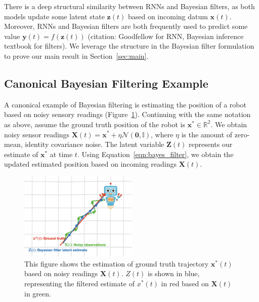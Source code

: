 \documentclass[12pt]{article}
\begin{document}
There is a deep structural similarity between RNNs and Bayesian filters, as
both models update some latent state $\mathbf z(t)$ based on incoming datum
$\mathbf x(t)$. 
Moreover, RNNs and Bayesian filters are both frequently used to predict some
value $\mathbf y(t) = f(\mathbf z(t))$ (citation: Goodfellow for RNN, Bayesian
inference textbook for filters).
We leverage the structure in the Bayesian filter formulation to prove our main
result in Section~\ref{sec:main}. 


\subsection{Canonical Bayesian Filtering Example}
A canonical example of Bayesian filtering is estimating the position of a robot based on noisy sensory readings (Figure~\ref{fig:robot_filter_ex}). 
Continuing with the same notation as above, assume the ground truth position of the robot is $\mathbf x^* \in \mathbb R^2$. 
We obtain noisy sensor readings $\mathbf X(t) = \mathbf x^* + \eta \mathcal N(\mathbf 0, \mathbb I)$, where $\eta$ is the amount of zero-mean, identity covariance noise. 
The latent variable $\mathbf Z(t)$ represents our estimate of $\mathbf x^*$ at time $t$. 
Using Equation~\ref{eqn:bayes_filter}, we obtain the updated estimated position based on incoming readings $\mathbf X(t)$. \\

\begin{figure}[h! tbp]
	\centering 
	\includegraphics[width=0.5\textwidth]{media/robot_filter.png}
	\caption[Canonical filtering task]{This figure shows the estimation of ground truth trajectory $\mathbf x^*(t)$ based on noisy readings $\mathbf X(t)$. $Z(t)$ is shown in blue, representing the filtered estimate of $x^*(t)$ in red based on $\mathbf X(t)$ in green.}
	\label{fig:robot_filter_ex}
\end{figure}
\end{document}

